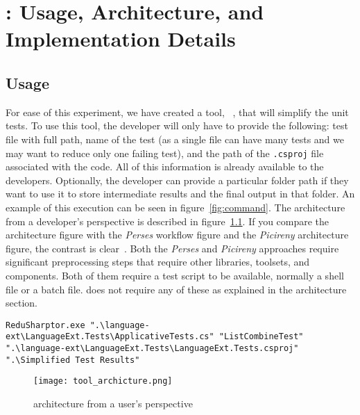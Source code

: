 \clearpage %

\chapter{\mytool: Usage, Architecture, and Implementation Details}\label{CH4_ToolUsage}

\section{Usage}
For ease of this experiment, we have created a tool, \mytool~\cite{weber_2022}, that will simplify the unit tests. To use this tool, the developer will only have to provide the following: test file with full path, name of the test (as a single file can have many tests and we may want to reduce only one failing test), and the path of the \texttt{.csproj} file associated with the code. All of this information is already available to the developers. Optionally, the developer can provide a particular folder path if they want to use it to store intermediate results and the final output in that folder. An example of this execution can be seen in figure~\ref{fig:command}. The architecture from a developer's perspective is described in figure~\ref{fig:tool_architecture}. If you compare the architecture figure with the \emph{Perses} workflow figure and the \emph{Picireny} architecture figure, the contrast is clear~\cite{hodovan2016modernizing, perses}. Both the \emph{Perses} and \emph{Picireny} approaches require significant preprocessing steps that require other libraries, toolsets, and components. Both of them require a test script to be available, normally a shell file or a batch file. \mytool does not require any of these as explained in the architecture section. 

\begin{figure*}
\begin{lstlisting}
ReduSharptor.exe ".\language-ext\LanguageExt.Tests\ApplicativeTests.cs" "ListCombineTest" ".\language-ext\LanguageExt.Tests\LanguageExt.Tests.csproj" ".\Simplified Test Results"
\end{lstlisting}
\caption{\texttt command line execution of \mytool}
\label{fig:command}
\end{figure*}

\begin{center}
\begin{figure}[!ht]
\texttt{[image: tool\_archicture.png]}
\caption{\mytool architecture from a user's perspective}
\label{fig:tool_architecture}
\end{figure}
\end{center}

